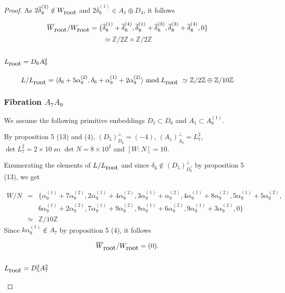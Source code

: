 \documentclass{amsart}
\begin{document}
\begin{proof}
As $2\overline{\delta}_6^{(2)}\notin W_{\hbox{root}}$ and $2\overline{\delta}_6^{(1)}\in A_1\oplus D_4$, it follows

$$\overline{W}_{\hbox{root}}/W_{\hbox{root}}=\{\overline{\delta}_6^{(1)}+\overline{\delta}_6^{(4)},\overline{\delta}_6^{(1)}+\overline{\delta}_6^{(3)},\overline{\delta}_6^{(3)}+\overline{\delta}_6^{(4)},0 \}$$
$$\simeq \mathbb Z/2 \mathbb Z \times \mathbb Z/2\mathbb Z $$

\subsection{$L_{\hbox{root}}=D_6A_9^2$}

$$L/L_{\hbox{root}}=\langle \delta_6+5\alpha_9^{(2)},\delta_6+\alpha_9^{(1)}+2\alpha_9^{(2)} \rangle\,\, \hbox{mod.} L_{\hbox{root}}\,\,\simeq \mathbb Z /2 \mathbb Z \oplus \mathbb Z/10 \mathbb Z $$

\subsubsection{Fibration $A_7A_9$}

We assume the following primitive embeddings $D_5\subset D_6$ and $A_1 \subset A_9^{(1)}$.

By proposition 5 (13) and (4), $(D_5)_{D_6}^{\perp}=(-4)$, $(A_1)_{A_9}^{\perp}=L_7^2$, $\det L_7^2=2\times 10$ so $\det N=8\times 10^2$ and $[W:N]=10$.

Enumerating the elements of $L/L_{\hbox{root}}$ and since $\delta_6 \notin (D_5)_{D_6^*}^{\perp}$ by proposition 5 (13), we get

$$
\begin{array}{lll}
W/N & = &\{ \alpha_9^{(1)}+7\alpha_9^{(2)}, 2\alpha_9^{(1)}+4\alpha_9^{(2)}, 3 \alpha_9^{(1)}+\alpha_9^{(2)},  4\alpha_9^{(1)}+8\alpha_9^{(2)},  5\alpha_9^{(1)}+5\alpha_9^{(2)}, \\
& &  6\alpha_9^{(1)}+2\alpha_9^{(2)}, 7 \alpha_9^{(1)}+9\alpha_9^{(2)}, 8 \alpha_9^{(1)}+6\alpha_9^{(2)}, 9 \alpha_9^{(1)}+3\alpha_9^{(2)}, 0 \}\\
 & \simeq & \mathbb Z /10 \mathbb Z
\end{array}
$$
Since $k\alpha_9^{(1)} \notin A_7$ by proposition 5 (4), it follows

$$\overline{W}_{\hbox{root}}/W_{\hbox{root}}=(0).$$


\subsection{$L_{\hbox{root}}=D_5^2A_7^2$}


\end{proof}
\end{document}
